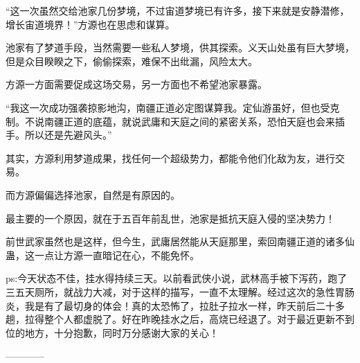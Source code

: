 \begin{this_body}
“这一次虽然交给池家几份梦境，不过宙道梦境已有许多，接下来就是安静潜修，增长宙道境界！”方源也在思虑和谋算。

池家有了梦道手段，当然需要一些私人梦境，供其探索。义天山处虽有巨大梦境，但是众目睽睽之下，偷偷探索，难保不出纰漏，风险太大。

方源一方面需要促成这场交易，另一方面也不希望池家暴露。

“我这一次成功强袭掠影地沟，南疆正道必定图谋算我。定仙游虽好，但也受克制。不说南疆正道的底蕴，就说武庸和天庭之间的紧密关系，恐怕天庭也会来插手。所以还是先避风头。”

其实，方源利用梦道成果，找任何一个超级势力，都能令他们化敌为友，进行交易。

而方源偏偏选择池家，自然是有原因的。

最主要的一个原因，就在于五百年前乱世，池家是抵抗天庭入侵的坚决势力！

前世武家虽然也是这样，但今生，武庸居然能从天庭那里，索回南疆正道的诸多仙蛊，这一点让方源一直暗记在心，不能免怀。

ps:今天状态不佳，挂水得持续三天。以前看武侠小说，武林高手被下泻药，跑了三五天厕所，就战力大减，对于这样的描写，一直不太理解。经过这次的急性胃肠炎，我是有了最切身的体会！真的太恐怖了，拉肚子拉水一样，昨天前后二十多趟，拉得整个人都虚脱了。好在昨晚挂水之后，高烧已经退了。对于最近更新不到位的地方，十分抱歉，同时万分感谢大家的关心！

------------

\end{this_body}

